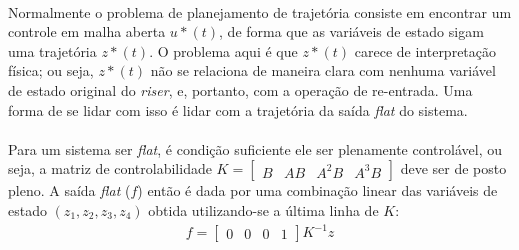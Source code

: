 \documentclass[a4paper,11pt]{scrartcl} %
\numberwithin{equation}{section} %
\numberwithin{figure}{section} %
\numberwithin{table}{section} %
\begin{document}
\paragraph{} Normalmente o problema de planejamento de trajetória consiste em encontrar um controle em malha aberta $u*(t)$, de forma que as variáveis de estado sigam uma trajetória $z*(t)$. O problema aqui é que $z*(t)$ carece de interpretação física; ou seja, $z*(t)$ não se relaciona de maneira clara com nenhuma variável de estado original do \textit{riser}, e, portanto, com a operação de re-entrada. Uma forma de se lidar com isso é lidar com a trajetória da saída \textit{flat} do sistema. %

\paragraph{} Para um sistema ser \textit{flat}, é condição suficiente ele ser plenamente controlável, ou seja, a matriz de controlabilidade $K = \left[
\begin{array}{cccc}
B & AB & A^{2}B & A^{3}B
\end{array} \right ]$ deve ser de posto pleno. A saída \textit{flat} ($f$) então é dada por uma combinação linear das variáveis de estado $\left (z_1, z_2, z_3, z_4 \right )$ obtida utilizando-se a última linha de $K$:
\begin{align}
	f = \left[\begin{array}{cccc}
	0 & 0 & 0 & 1
	\end{array}\right]K^{-1}z
\end{align} %
\end{document}
